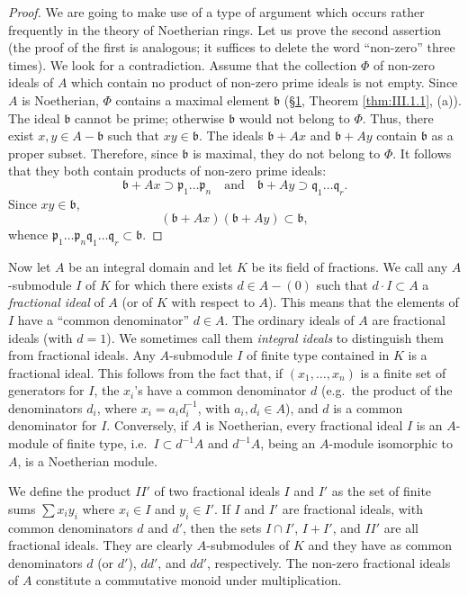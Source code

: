 \begin{proof}
We are going to make use of a type of argument which occurs rather
frequently in the theory of Noetherian rings. Let us prove the second
assertion (the proof of the first is analogous; it suffices to delete the
word ``non-zero'' three times). We look for a contradiction. Assume that the
collection $\Phi$ of non-zero ideals of $A$ which contain no product of
non-zero prime ideals is not empty. Since $A$ is Noetherian, $\Phi$ contains
a maximal element $\mathfrak{b}$ (\hyperref[sec:3.1]{§1}, Theorem \ref{thm:III.1.1}, (a)). The
ideal $\mathfrak{b}$ cannot be prime; otherwise $\mathfrak{b}$ would not
belong to $\Phi$. Thus, there exist $x,y\in A-\mathfrak{b}$ such that
$xy\in\mathfrak{b}$. The ideals $\mathfrak{b}+Ax$ and $\mathfrak{b}+Ay$
contain $\mathfrak{b}$ as a proper subset. Therefore, since $\mathfrak{b}$ is
maximal, they do not belong to $\Phi$. It follows that they both contain
products of non-zero prime ideals:
\[
\mathfrak{b}+Ax\supset\mathfrak{p}_{1}\ldots\mathfrak{p}_{n}
\quad\text{and}\quad
\mathfrak{b}+Ay\supset\mathfrak{q}_{1}\ldots\mathfrak{q}_{r}.
\]
Since $xy\in\mathfrak{b}$,
\[
(\mathfrak{b}+Ax)(\mathfrak{b}+Ay)\subset\mathfrak{b},
\]
whence
$\mathfrak{p}_{1}\ldots\mathfrak{p}_{n}\mathfrak{q}_{1}\ldots
\mathfrak{q}_{r}\subset\mathfrak{b}$.
\end{proof}

Now let $A$ be an integral domain and let $K$ be its field of fractions. We
call any $A$-submodule $I$ of $K$ for which there exists $d\in A-(0)$ such
that $d\cdot I\subset A$ a \emph{fractional ideal} of $A$ (or of $K$ with
respect to $A$). This means that the elements of $I$ have a ``common
denominator'' $d\in A$. The ordinary ideals of $A$ are fractional ideals
(with $d=1$). We sometimes call them \emph{integral ideals} to distinguish
them from fractional ideals. Any $A$-submodule $I$ of finite type contained
in $K$ is a fractional ideal. This follows from the fact that, if
$(x_{1},\ldots,x_{n})$ is a finite set of generators for $I$, the $x_{i}$'s
have a common denominator $d$ (e.g.\ the product of the denominators $d_{i}$,
where $x_{i}=a_{i}d_{i}^{-1}$, with $a_{i},d_{i}\in A$), and $d$ is a common
denominator for $I$. Conversely, if $A$ is Noetherian, every fractional
ideal $I$ is an $A$-module of finite type, i.e.\ $I\subset d^{-1}A$ and
$d^{-1}A$, being an $A$-module isomorphic to $A$, is a Noetherian module.

We define the product $II'$ of two fractional ideals $I$ and $I'$ as the
set of finite sums $\sum x_{i}y_{i}$ where $x_{i}\in I$ and $y_{i}\in I'$.
If $I$ and $I'$ are fractional ideals, with common denominators $d$ and
$d'$, then the sets $I\cap I'$, $I+I'$, and $II'$ are all fractional ideals.
They are clearly $A$-submodules of $K$ and they have as common denominators
$d$ (or $d'$), $dd'$, and $dd'$, respectively. The non-zero fractional
ideals of $A$ constitute a commutative monoid under multiplication.

